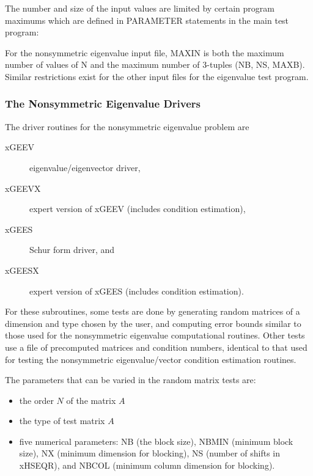 The number and size of the input values are limited by certain program
maximums which are defined in PARAMETER statements in the
main test program:


\noindent
For the nonsymmetric eigenvalue input file, {\rm MAXIN} is both the
maximum number of values of {\rm N} and the maximum number of 3-tuples
({\rm NB}, {\rm NS}, {\rm MAXB}).
Similar restrictions exist for the other input files for the eigenvalue
test program.

\subsubsection{The Nonsymmetric Eigenvalue Drivers}

The driver routines for the nonsymmetric eigenvalue problem are
\begin{description}
\item[xGEEV] eigenvalue/eigenvector driver,
\item[xGEEVX] expert version of xGEEV (includes condition estimation),
\item[xGEES] Schur form driver, and
\item[xGEESX] expert version of xGEES (includes condition estimation).
\end{description}

For these subroutines,
some tests are done by generating random matrices
of a dimension and type chosen by the user, and computing error bounds
similar to those used for the nonsymmetric eigenvalue computational
routines. Other tests use a file of precomputed matrices and condition
numbers, identical to that used for testing the nonsymmetric
eigenvalue/vector condition estimation routines.

The parameters that can be varied in the random matrix tests are:
\begin{itemize}
\item the order $N$ of the matrix $A$
\item the type of test matrix $A$
\item five numerical parameters:  NB (the block size),
NBMIN (minimum block size),
NX (minimum dimension for blocking),
NS (number of shifts in xHSEQR), and
NBCOL (minimum column dimension for blocking).
\end{itemize}

